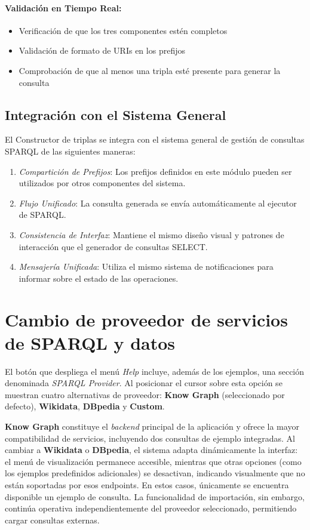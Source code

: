\documentclass{article}
\begin{document}
\paragraph{Validación en Tiempo Real:}
\begin{itemize}
    \item Verificación de que los tres componentes estén completos
    \item Validación de formato de URIs en los prefijos
    \item Comprobación de que al menos una tripla esté presente para generar la consulta
\end{itemize}

\subsection{Integración con el Sistema General}
\label{subsec:triple-integration}

El Constructor de triplas se integra con el sistema general de gestión de consultas SPARQL de las siguientes maneras:

\begin{enumerate}
    \item \textit{Compartición de Prefijos}: Los prefijos definidos en este módulo pueden ser utilizados por otros componentes del sistema.
    \item \textit{Flujo Unificado}: La consulta generada se envía automáticamente al ejecutor de SPARQL.
    \item \textit{Consistencia de Interfaz}: Mantiene el mismo diseño visual y patrones de interacción que el generador de consultas SELECT.
    \item \textit{Mensajería Unificada}: Utiliza el mismo sistema de notificaciones para informar sobre el estado de las operaciones.
\end{enumerate}

\section{Cambio de proveedor de servicios de SPARQL y datos}

El botón que despliega el menú \textit{Help} incluye, además de los ejemplos, una sección denominada \textit{SPARQL Provider}. Al posicionar el cursor sobre esta opción se muestran cuatro alternativas de proveedor: \textbf{Know Graph} (seleccionado por defecto), \textbf{Wikidata}, \textbf{DBpedia} y \textbf{Custom}.  

\textbf{Know Graph} constituye el \textit{backend} principal de la aplicación y ofrece la mayor compatibilidad de servicios, incluyendo dos consultas de ejemplo integradas. Al cambiar a \textbf{Wikidata} o \textbf{DBpedia}, el sistema adapta dinámicamente la interfaz: el menú de visualización permanece accesible, mientras que otras opciones (como los ejemplos predefinidos adicionales) se desactivan, indicando visualmente que no están soportadas por esos endpoints. En estos casos, únicamente se encuentra disponible un ejemplo de consulta. La funcionalidad de importación, sin embargo, continúa operativa independientemente del proveedor seleccionado, permitiendo cargar consultas externas.  
\end{document}
